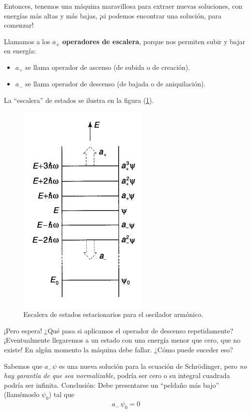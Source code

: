 Entonces, tenemos una máquina maravillosa para extraer nuevas soluciones, con energías más altas y más bajas, ¡si podemos encontrar una solución, para comenzar!
\par
Llamamos a los $a_{\pm}$ \textbf{operadores de escalera}, porque nos permiten subir y bajar en energía:
\begin{itemize}
\item $a_{+}$ se llama operador de ascenso (de subida o de creación).
\item $a_{-}$ se llama operador de descenso (de bajada o de aniquilación).
\end{itemize}
La \enquote{escalera} de estados se ilustra en la figura (\ref{fig:figura_002}).
\begin{figure}[H]
    \centering
    \includegraphics[scale=0.7]{Imagenes/Operadores_escalera.png}
    \caption{Escalera de estados estacionarios para el oscilador armónico.}
    \label{fig:figura_002}
\end{figure}
¡Pero espera! ¿Qué pasa si aplicamos el operador de descenso repetidamente? ¡Eventualmente llegaremos a un estado con una energía menor que cero, que no existe! En algún momento la máquina debe fallar. ¿Cómo puede suceder eso? 
\par
Sabemos que $a_{-} \psi$ es una nueva solución para la ecuación de Schrödinger, pero \emph{no hay garantía de que sea normalizable}, podría ser cero o su integral cuadrada podría ser infinita. Conclusión: Debe presentarse un \enquote{peldaño más bajo} (llamémoslo $\psi_{0}$) tal que
\begin{align}
a_{-} \, \psi_{0} = 0
\label{eq:ecuacion_02_058}
\end{align}

